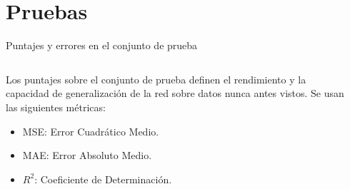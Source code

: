 \documentclass[10pt]{beamer}
\begin{document}
\section*{Pruebas}
\begin{frame}{Puntajes y errores en el conjunto de prueba}
    \begin{columns}
        \begin{column}{0.4\textwidth}
            \small{Los puntajes sobre el conjunto de prueba definen el rendimiento y la capacidad de generalización de la 
            red sobre datos nunca antes vistos. Se usan las siguientes métricas:}
    
            \begin{itemize}
                \item \alert{MSE}: Error Cuadrático Medio.
                \item \alert{MAE}: Error Absoluto Medio.
                \item \alert{$R^2$}: Coeficiente de Determinación.
            \end{itemize}
        \end{column}
        \begin{column}{0.6\textwidth}
            \begin{table}[!h]
                \centering
                \caption[Evaluación de puntajes sobre el conjunto de prueba.]{Evaluación de puntajes sobre el conjunto de prueba. Fuente: Elaboración propia.}
                \label{tbl:testscores}
            \end{table}
        \end{column}
    \end{columns}
\end{frame}
\end{document}
